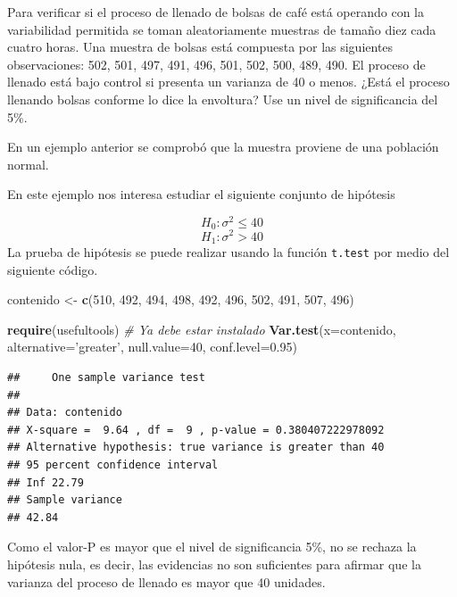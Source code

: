 \documentclass[10pt,]{krantz}
\makeatletter
\newenvironment{Shaded}{\begin{snugshade}}{\end{snugshade}}
\newcommand{\KeywordTok}[1]{\textcolor[rgb]{0.13,0.29,0.53}{\textbf{{#1}}}}
\newcommand{\DataTypeTok}[1]{\textcolor[rgb]{0.13,0.29,0.53}{{#1}}}
\newcommand{\DecValTok}[1]{\textcolor[rgb]{0.00,0.00,0.81}{{#1}}}
\newcommand{\FloatTok}[1]{\textcolor[rgb]{0.00,0.00,0.81}{{#1}}}
\newcommand{\StringTok}[1]{\textcolor[rgb]{0.31,0.60,0.02}{{#1}}}
\newcommand{\CommentTok}[1]{\textcolor[rgb]{0.56,0.35,0.01}{\textit{{#1}}}}
\newcommand{\NormalTok}[1]{{#1}}
\newenvironment{kframe}{%
\medskip{}
\setlength{\fboxsep}{.8em}
 \def\at@end@of@kframe{}%
 \ifinner\ifhmode%
  \def\at@end@of@kframe{\end{minipage}}%
  \begin{minipage}{\columnwidth}%
 \fi\fi%
 \def\FrameCommand##1{\hskip\@totalleftmargin \hskip-\fboxsep
 \colorbox{shadecolor}{##1}\hskip-\fboxsep
     \hskip-\linewidth \hskip-\@totalleftmargin \hskip\columnwidth}%
 \MakeFramed {\advance\hsize-\width
   \@totalleftmargin\z@ \linewidth\hsize
   \@setminipage}}%
 {\par\unskip\endMakeFramed%
 \at@end@of@kframe}
\renewenvironment{Shaded}{\begin{kframe}}{\end{kframe}}
\makeatother
\begin{document}
Para verificar si el proceso de llenado de bolsas de café está operando
con la variabilidad permitida se toman aleatoriamente muestras de tamaño
diez cada cuatro horas. Una muestra de bolsas está compuesta por las
siguientes observaciones: 502, 501, 497, 491, 496, 501, 502, 500, 489,
490. El proceso de llenado está bajo control si presenta un varianza de
40 o menos. ¿Está el proceso llenando bolsas conforme lo dice la
envoltura? Use un nivel de significancia del 5\%.

En un ejemplo anterior se comprobó que la muestra proviene de una
población normal.

En este ejemplo nos interesa estudiar el siguiente conjunto de hipótesis

\[H_0: \sigma^2 \leq 40\] \[H_1: \sigma^2 > 40\] La prueba de hipótesis
se puede realizar usando la función \texttt{t.test} por medio del
siguiente código.

\begin{Shaded}
\begin{Highlighting}[]
\NormalTok{contenido <-}\StringTok{ }\KeywordTok{c}\NormalTok{(}\DecValTok{510}\NormalTok{, }\DecValTok{492}\NormalTok{, }\DecValTok{494}\NormalTok{, }\DecValTok{498}\NormalTok{, }\DecValTok{492}\NormalTok{,}
               \DecValTok{496}\NormalTok{, }\DecValTok{502}\NormalTok{, }\DecValTok{491}\NormalTok{, }\DecValTok{507}\NormalTok{, }\DecValTok{496}\NormalTok{)}

\KeywordTok{require}\NormalTok{(usefultools)  }\CommentTok{# Ya debe estar instalado}
\KeywordTok{Var.test}\NormalTok{(}\DataTypeTok{x=}\NormalTok{contenido, }\DataTypeTok{alternative=}\StringTok{'greater'}\NormalTok{,}
         \DataTypeTok{null.value=}\DecValTok{40}\NormalTok{, }\DataTypeTok{conf.level=}\FloatTok{0.95}\NormalTok{)}
\end{Highlighting}
\end{Shaded}

\begin{verbatim}
##     One sample variance test   
## 
## Data: contenido 
## X-square =  9.64 , df =  9 , p-value = 0.380407222978092 
## Alternative hypothesis: true variance is greater than 40 
## 95 percent confidence interval 
## Inf 22.79 
## Sample variance 
## 42.84
\end{verbatim}

Como el valor-P es mayor que el nivel de significancia 5\%, no se
rechaza la hipótesis nula, es decir, las evidencias no son suficientes
para afirmar que la varianza del proceso de llenado es mayor que 40
unidades.
\end{document}
